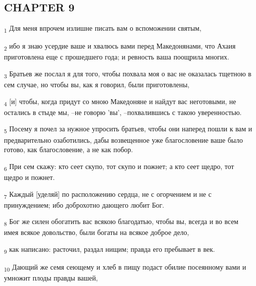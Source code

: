\subsection{CHAPTER 9}
\begin{tcolorbox}
\textsubscript{1} Для меня впрочем излишне писать вам о вспоможении святым,
\end{tcolorbox}
\begin{tcolorbox}
\textsubscript{2} ибо я знаю усердие ваше и хвалюсь вами перед Македонянами, что Ахаия приготовлена еще с прошедшего года; и ревность ваша поощрила многих.
\end{tcolorbox}
\begin{tcolorbox}
\textsubscript{3} Братьев же послал я для того, чтобы похвала моя о вас не оказалась тщетною в сем случае, но чтобы вы, как я говорил, были приготовлены,
\end{tcolorbox}
\begin{tcolorbox}
\textsubscript{4} [и] чтобы, когда придут со мною Македоняне и найдут вас неготовыми, не остались в стыде мы, --не говорю 'вы', --похвалившись с такою уверенностью.
\end{tcolorbox}
\begin{tcolorbox}
\textsubscript{5} Посему я почел за нужное упросить братьев, чтобы они наперед пошли к вам и предварительно озаботились, дабы возвещенное уже благословение ваше было готово, как благословение, а не как побор.
\end{tcolorbox}
\begin{tcolorbox}
\textsubscript{6} При сем скажу: кто сеет скупо, тот скупо и пожнет; а кто сеет щедро, тот щедро и пожнет.
\end{tcolorbox}
\begin{tcolorbox}
\textsubscript{7} Каждый [уделяй] по расположению сердца, не с огорчением и не с принуждением; ибо доброхотно дающего любит Бог.
\end{tcolorbox}
\begin{tcolorbox}
\textsubscript{8} Бог же силен обогатить вас всякою благодатью, чтобы вы, всегда и во всем имея всякое довольство, были богаты на всякое доброе дело,
\end{tcolorbox}
\begin{tcolorbox}
\textsubscript{9} как написано: расточил, раздал нищим; правда его пребывает в век.
\end{tcolorbox}
\begin{tcolorbox}
\textsubscript{10} Дающий же семя сеющему и хлеб в пищу подаст обилие посеянному вами и умножит плоды правды вашей,
\end{tcolorbox}
